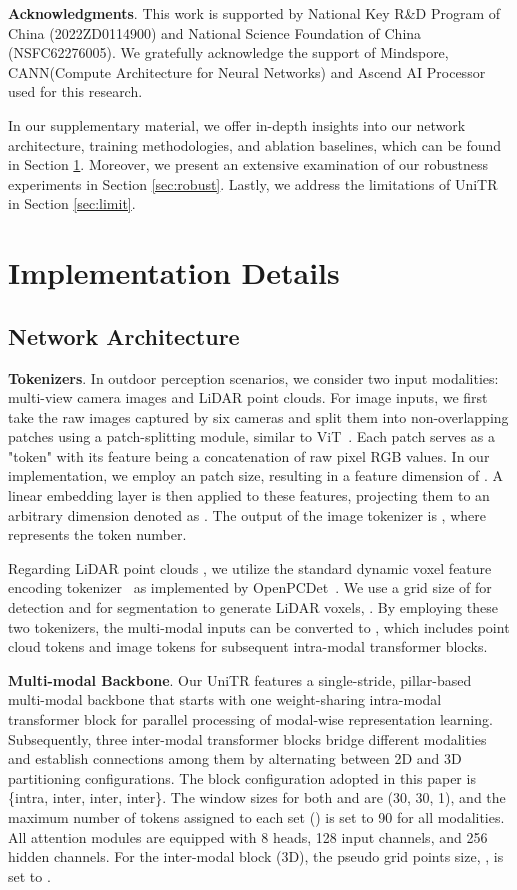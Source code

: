 \documentclass[10pt,twocolumn,letterpaper]{article}
\begin{document}
\noindent \textbf{Acknowledgments}. This work is supported by National Key R\&D Program of China (2022ZD0114900) and National Science Foundation of China (NSFC62276005). We gratefully acknowledge the support of Mindspore, CANN(Compute Architecture for Neural Networks) and Ascend AI Processor used for this research. 

{\small


}

\newpage
\appendix

In our supplementary material, we offer in-depth insights into our network architecture, training methodologies, and ablation baselines, which can be found in Section \ref{sec:imple_app}. Moreover, we present an extensive examination of our robustness experiments in Section \ref{sec:robust}. Lastly, we address the limitations of UniTR in Section \ref{sec:limit}.
\section{Implementation Details} \label{sec:imple_app}
\subsection{Network Architecture}
\noindent \textbf{Tokenizers}. In outdoor perception scenarios, we consider two input modalities: multi-view camera images and LiDAR point clouds. For image inputs, we first take the raw images  captured by six cameras and split them into non-overlapping patches using a patch-splitting module, similar to ViT~\cite{dosovitskiy2021an}. Each patch serves as a "token" with its feature being a concatenation of raw pixel RGB values. In our implementation, we employ an  patch size, resulting in a feature dimension of . A linear embedding layer is then applied to these features, projecting them to an arbitrary dimension denoted as . The output of the image tokenizer is , where  represents the token number.

Regarding LiDAR point clouds , we utilize the standard dynamic voxel feature encoding tokenizer~\cite{zhou2020end} as implemented by OpenPCDet~\cite{openpcdet2020}. We use a grid size of  for detection and  for segmentation to generate LiDAR voxels, . By employing these two tokenizers, the multi-modal inputs can be converted to , which includes  point cloud tokens and  image tokens for subsequent intra-modal transformer blocks.

\noindent \textbf{Multi-modal Backbone}. Our UniTR features a single-stride, pillar-based multi-modal backbone that starts with one weight-sharing intra-modal transformer block for parallel processing of modal-wise representation learning. Subsequently, three inter-modal transformer blocks bridge different modalities and establish connections among them by alternating between 2D and 3D partitioning configurations. The block configuration adopted in this paper is \{intra, inter, inter, inter\}. The window sizes for both  and  are (30, 30, 1), and the maximum number of tokens assigned to each set () is set to 90 for all modalities. All attention modules are equipped with 8 heads, 128 input channels, and 256 hidden channels. For the inter-modal block (3D), the pseudo grid points size, , is set to .
\end{document}
